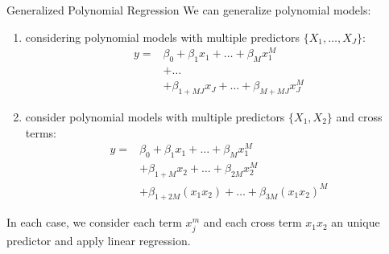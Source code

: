 \documentclass[12pt,t]{beamer}
\begin{document}
\begin{frame}{Generalized Polynomial Regression} \small
\vskip-0.4cm
We can generalize polynomial models:
\begin{enumerate}
\item considering polynomial models with multiple predictors $\{X_1, \ldots, X_J\}$:
\begin{align*}
y = &\beta_0 + \beta_1 x_1 + \ldots + \beta_M x^M_1 \\
&+ \ldots \\
&+ \beta_{1 + MJ} x_J + \ldots + \beta_{M + MJ} x^M_J
\end{align*}
\item consider polynomial models with multiple predictors $\{X_1, X_2\}$ and cross terms:
\begin{align*}
y = & \beta_0 + \beta_1 x_1 + \ldots + \beta_M x^M_1\\
&+ \beta_{1 + M} x_2 + \ldots + \beta_{2M} x^M_2 \\
&+ \beta_{1 + 2M} (x_1x_2) + \ldots + \beta_{3M} (x_1x_2)^M
\end{align*}
\end{enumerate}
In each case, we consider each term $x^m_j$ and each cross term $x_1x_2$ an unique predictor and apply linear regression.
\end{frame}
\end{document}
